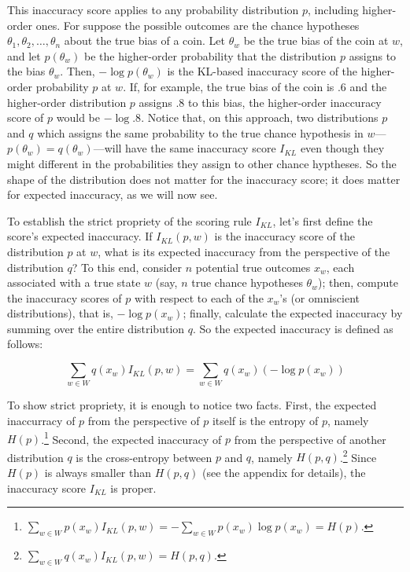 \documentclass[
  letterpaper,
  DIV=11,
  numbers=noendperiod]{scrartcl}
\begin{document}
This inaccuracy score applies to any probability distribution \(p\),
including higher-order ones. For suppose the possible outcomes are the
chance hypotheses \(\theta_1, \theta_2, \dots, \theta_n\) about the true
bias of a coin. Let \(\theta_w\) be the true bias of the coin at \(w\),
and let \(p(\theta_w)\) be the higher-order probability that the
distribution \(p\) assigns to the bias \(\theta_w\). Then,
\(-\log p(\theta_w)\) is the KL-based inaccuracy score of the
higher-order probability \(p\) at \(w\). If, for example, the true bias
of the coin is \(.6\) and the higher-order distribution \(p\) assigns
\(.8\) to this bias, the higher-order inaccuracy score of \(p\) would be
\(-\log .8\). Notice that, on this approach, two distributions \(p\) and
\(q\) which assigns the same probability to the true chance hypothesis
in \(w\)---\(p(\theta_w)=q(\theta_w)\)---will have the same inaccuracy
score \(I_{KL}\) even though they might different in the probabilities
they assign to other chance hyptheses. So the shape of the distribution
does not matter for the inaccuracy score; it does matter for expected
inaccuracy, as we will now see.

To establish the strict propriety of the scoring rule \(I_{KL}\), let's
first define the score's expected inaccuracy. If \(I_{KL}(p, w)\) is the
inaccuracy score of the distribution \(p\) at \(w\), what is its
expected inaccuracy from the perspective of the distribution \(q\)? To
this end, consider \(n\) potential true outcomes \(x_w\), each
associated with a true state \(w\) (say, \(n\) true chance hypotheses
\(\theta_w\)); then, compute the inaccuracy scores of \(p\) with respect
to each of the \(x_w\)'s (or omniscient distributions), that is,
\(-\log p(x_w)\); finally, calculate the expected inaccuracy by summing
over the entire distribution \(q\). So the expected inaccuracy is
defined as follows:

\[\sum_{w\in W} q(x_w)I_{KL}(p, w) = \sum_{w\in W} q(x_w)(-\log p(x_w)) \]

\noindent To show strict propriety, it is enough to notice two facts.
First, the expected inaccurracy of \(p\) from the perspective of \(p\)
itself is the entropy of \(p\), namely \(H(p)\).\footnote{\(\sum_{w\in W} p(x_w)I_{KL}(p, w) = -\sum_{w\in W} p(x_w)\log p(x_w) = H(p).\)}
Second, the expected inaccuracy of \(p\) from the perspective of another
distribution \(q\) is the cross-entropy between \(p\) and \(q\), namely
\(H(p, q)\).\footnote{\(\sum_{w\in W} q(x_w)I_{KL}(p, w) = H(p, q).\)}
Since \(H(p)\) is always smaller than \(H(p, q)\) (see the appendix for
details), the inaccuracy score \(I_{KL}\) is proper.
\end{document}
